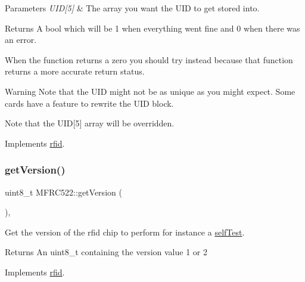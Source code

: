 \begin{DoxyParams}{Parameters}
{\em U\+I\+D\mbox{[}5\mbox{]}} & The array you want the U\+ID to get stored into. \\
\hline
\end{DoxyParams}
\begin{DoxyReturn}{Returns}
A bool which will be 1 when everything went fine and 0 when there was an error.
\end{DoxyReturn}
When the function returns a zero you should try  instead because that function returns a more accurate return status. \begin{DoxyWarning}{Warning}
Note that the U\+ID might not be as unique as you might expect. Some cards have a feature to rewrite the U\+ID block. 

Note that the U\+ID\mbox{[}5\mbox{]} array will be overridden. 
\end{DoxyWarning}


Implements \mbox{\hyperlink{classrfid_aaeb826495120d8d29683f0ea1b985d77}{rfid}}.

\mbox{\label{class_m_f_r_c522_a25fb0a50bf7db51ab9c5bc2ff4fa84e3}} 
\subsubsection{\texorpdfstring{get\+Version()}{getVersion()}}
{\footnotesize\ttfamily uint8\+\_\+t M\+F\+R\+C522\+::get\+Version (\begin{DoxyParamCaption}{ }\end{DoxyParamCaption})\hspace{0.3cm}{\ttfamily [override]}, {\ttfamily [virtual]}}



Get the version of the rfid chip to perform for instance a \mbox{\hyperlink{class_m_f_r_c522_adcc4f5eb212c1a94e462eab459bd685e}{self\+Test}}. 

\begin{DoxyReturn}{Returns}
An uint8\+\_\+t containing the version value 1 or 2 
\end{DoxyReturn}


Implements \mbox{\hyperlink{classrfid_a27619628e718bb781f912aead770079a}{rfid}}.

\mbox{\label{class_m_f_r_c522_a016df9ed0421397c634cc79c475dbe3b}} 
